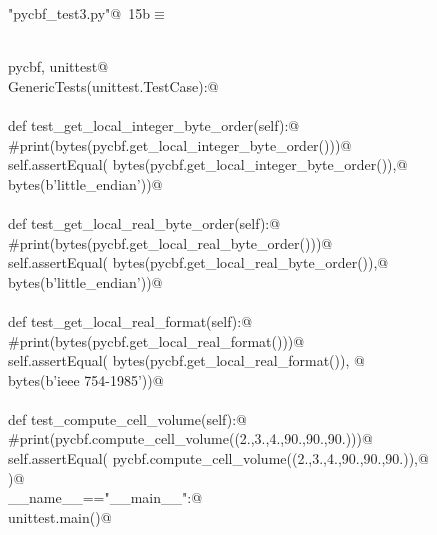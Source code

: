 \documentclass[10pt,a4paper,twoside,notitlepage]{article}
\begin{document}
\begin{flushleft} \small
\begin{minipage}{\linewidth}\label{scrap15}\raggedright\small
{} \verb@"pycbf_test3.py"@\nobreak\ {\footnotesize {15b}}$\equiv$
\vspace{-1ex}
\begin{list}{}{} \item
\mbox{}\verb@@\\
\mbox{}\verb@import pycbf, unittest@\\
\mbox{}\verb@class GenericTests(unittest.TestCase):@\\
\mbox{}\verb@@\\
\mbox{}\verb@    def test_get_local_integer_byte_order(self):@\\
\mbox{}\verb@        #print(bytes(pycbf.get_local_integer_byte_order()))@\\
\mbox{}\verb@        self.assertEqual( bytes(pycbf.get_local_integer_byte_order()),@\\
\mbox{}\verb@                         bytes(b'little_endian'))@\\
\mbox{}\verb@@\\
\mbox{}\verb@    def test_get_local_real_byte_order(self):@\\
\mbox{}\verb@        #print(bytes(pycbf.get_local_real_byte_order()))@\\
\mbox{}\verb@        self.assertEqual( bytes(pycbf.get_local_real_byte_order()),@\\
\mbox{}\verb@                          bytes(b'little_endian'))@\\
\mbox{}\verb@@\\
\mbox{}\verb@    def test_get_local_real_format(self):@\\
\mbox{}\verb@        #print(bytes(pycbf.get_local_real_format()))@\\
\mbox{}\verb@        self.assertEqual( bytes(pycbf.get_local_real_format()), @\\
\mbox{}\verb@                          bytes(b'ieee 754-1985'))@\\
\mbox{}\verb@@\\
\mbox{}\verb@    def test_compute_cell_volume(self):@\\
\mbox{}\verb@        #print(pycbf.compute_cell_volume((2.,3.,4.,90.,90.,90.)))@\\
\mbox{}\verb@        self.assertEqual( pycbf.compute_cell_volume((2.,3.,4.,90.,90.,90.)),@\\
\mbox{})@\\
\mbox{}\verb@if __name__=="__main__":@\\
\mbox{}\verb@    unittest.main()@\\
\mbox{}\verb@@\\
\mbox{}\verb@@{\NWsep}
\end{list}
\vspace{-1.5ex}
\footnotesize
\begin{list}{}{\setlength{\itemsep}{-\parsep}\setlength{\itemindent}{-\leftmargin}}


\end{list}
\end{minipage}
\end{flushleft}
\end{document}
